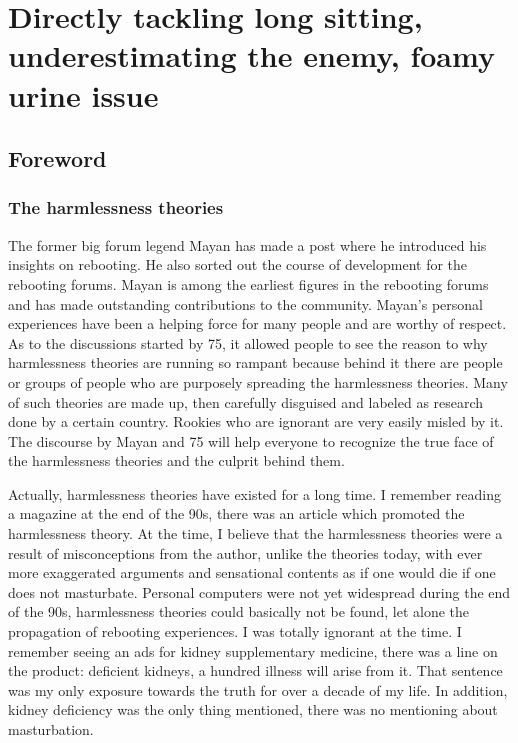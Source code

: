 \documentclass[
]{book}
\begin{document}
\hypertarget{directly-tackling-long-sitting-underestimating-the-enemy-foamy-urine-issue}{%
\chapter{Directly tackling long sitting, underestimating the enemy, foamy urine issue}\label{directly-tackling-long-sitting-underestimating-the-enemy-foamy-urine-issue}}

\hypertarget{foreword-6}{%
\section{Foreword}\label{foreword-6}}

\hypertarget{the-harmlessness-theories}{%
\subsection{The harmlessness theories}\label{the-harmlessness-theories}}

The former big forum legend Mayan has made a post where he introduced his insights on rebooting. He also sorted out the course of development for the rebooting forums. Mayan is among the earliest figures in the rebooting forums and has made outstanding contributions to the community. Mayan's personal experiences have been a helping force for many people and are worthy of respect. As to the discussions started by 75, it allowed people to see the reason to why harmlessness theories are running so rampant because behind it there are people or groups of people who are purposely spreading the harmlessness theories. Many of such theories are made up, then carefully disguised and labeled as research done by a certain country. Rookies who are ignorant are very easily misled by it. The discourse by Mayan and 75 will help everyone to recognize the true face of the harmlessness theories and the culprit behind them.

Actually, harmlessness theories have existed for a long time. I remember reading a magazine at the end of the 90s, there was an article which promoted the harmlessness theory. At the time, I believe that the harmlessness theories were a result of misconceptions from the author, unlike the theories today, with ever more exaggerated arguments and sensational contents as if one would die if one does not masturbate. Personal computers were not yet widespread during the end of the 90s, harmlessness theories could basically not be found, let alone the propagation of rebooting experiences. I was totally ignorant at the time. I remember seeing an ads for kidney supplementary medicine, there was a line on the product: deficient kidneys, a hundred illness will arise from it. That sentence was my only exposure towards the truth for over a decade of my life. In addition, kidney deficiency was the only thing mentioned, there was no mentioning about masturbation.
\end{document}

